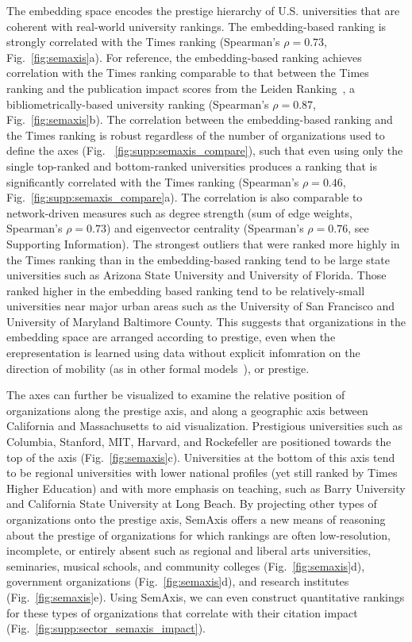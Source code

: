 \documentclass[12pt]{article} %
\def\SI{Supporting Information}
\begin{document}
The embedding space encodes the prestige hierarchy of U.S. universities that are coherent with real-world university rankings.
The embedding-based ranking is strongly correlated with the Times ranking (Spearman's $\rho = 0.73$, Fig.~\ref{fig:semaxis}a).
For reference, the embedding-based ranking achieves correlation with the Times ranking comparable to that between the Times ranking and the publication impact scores from the Leiden Ranking~\autocite{waltman2012leidenrankings}, a bibliometrically-based university ranking (Spearman's $\rho = 0.87$, Fig.~\ref{fig:semaxis}b).
The correlation between the embedding-based ranking and the Times ranking is robust regardless of the number of organizations used to define the axes (Fig. ~\ref{fig:supp:semaxis_compare}), such that even using only the single top-ranked and bottom-ranked universities produces a ranking that is significantly correlated with the Times ranking (Spearman's $\rho = 0.46$, Fig.~\ref{fig:supp:semaxis_compare}a).
The correlation is also comparable to network-driven measures such as degree strength (sum of edge weights, Spearman's $\rho = 0.73$) and eigenvector centrality (Spearman's $\rho = 0.76$, see \SI). 
The strongest outliers that were ranked more highly in the Times ranking than in the embedding-based ranking tend to be large state universities such as Arizona State University and  University of Florida.
Those ranked higher in the embedding based ranking tend to be relatively-small universities near major urban areas such as the University of San Francisco and University of Maryland Baltimore County.
This suggests that organizations in the embedding space are arranged according to prestige, even when the erepresentation is learned using data without explicit infomration on the direction of mobility (as in other formal models~\autocite{clauset2015hierarchy}), or prestige. 


The axes can further be visualized to examine the relative position of organizations along the prestige axis, and along a geographic axis between California and Massachusetts to aid visualization.
Prestigious universities such as Columbia, Stanford, MIT, Harvard, and Rockefeller are positioned towards the top of the axis (Fig.~\ref{fig:semaxis}c).
Universities at the bottom of this axis tend to be regional universities with lower national profiles (yet still ranked by Times Higher Education) and with more emphasis on teaching, such as Barry University and California State University at Long Beach.
By projecting other types of organizations onto the prestige axis, SemAxis offers a new means of reasoning about the prestige of organizations for which rankings are often low-resolution, incomplete, or entirely absent such as regional and liberal arts universities, seminaries, musical schools, and community colleges (Fig.~\ref{fig:semaxis}d), government organizations (Fig.~\ref{fig:semaxis}d), and research institutes (Fig.~\ref{fig:semaxis}e).
Using SemAxis, we can even construct quantitative rankings for these types of organizations that correlate with their citation impact (Fig.~\ref{fig:supp:sector_semaxis_impact}). 
\end{document}
